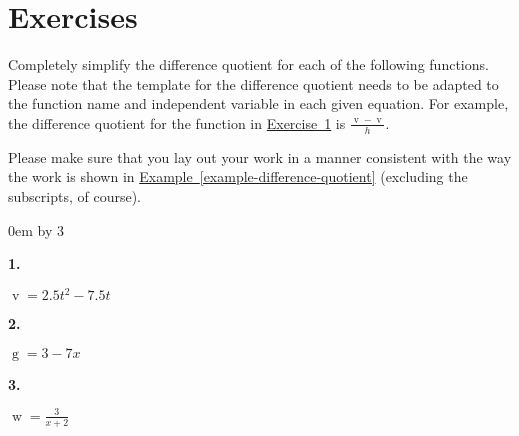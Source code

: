 \documentclass[12pt,]{book}
\theoremstyle{plain}
\theoremstyle{definition}
\numberwithin{equation}{section}
\newenvironment{exercisegroup}%
{\medskip\noindent}%
{\par\bigskip}%
\newlength{\exercisegroupindent}%
\newlength{\exercisegroupitemwidth}%
\newenvironment{exercisegrouplist}%
{\vspace{-\partopsep}%
\begin{adjustwidth}{\exercisegroupindent}{0em}}%
{\end{adjustwidth}%
\vspace{-\partopsep}%
\vspace{\baselineskip}}%
\newenvironment{exercisegroupbyrow}[1]%
{\begin{exercisegrouplist}%
\setlength{\parindent}{0em}%
\setlength{\exercisegroupitemwidth}{\linewidth}%
\addtolength{\exercisegroupitemwidth}{\columnsep}%
\divide\exercisegroupitemwidth by #1%
\addtolength{\exercisegroupitemwidth}{-\columnsep}}%
{\end{exercisegrouplist}}%
\newenvironment{exercisegroupitem}[1]%
{\begin{minipage}[t]{\exercisegroupitemwidth}
\vspace{0pt}%
{\bfseries#1}%
\rule{0pt}{\baselineskip}}{\strut%
\end{minipage}%
\hspace{\columnsep}}%
\providecommand\phantomsection{}
\newcommand{\fe}[2]{\mathop{{#1}{\left(#2\right)}}}
\begin{document}
\section*{Exercises}\label{exercises-3}

\begin{exercisegroup}%
Completely simplify the difference quotient for each of the following functions. Please note that the template for the difference quotient needs to be adapted to the function name and independent variable in each given equation. For example, the difference quotient for the function in \hyperref[exercise-first-difference-quotient]{Exercise~1} is \(\frac{\fe{v}{t+h}-\fe{v}{t}}{h}\).%
\par
Please make sure that you lay out your work in a manner consistent with the way the work is shown in \hyperref[example-difference-quotient]{Example~\ref*{example-difference-quotient}} (excluding the subscripts, of course).%
\par
\begin{exercisegroupbyrow}{3}%
\begin{exercisegroupitem}{1. }\phantomsection\hypertarget{exercise-first-difference-quotient}{\null}
\(\fe{v}{t}=2.5t^2-7.5t\)\end{exercisegroupitem}%
\begin{exercisegroupitem}{2. }\phantomsection\hypertarget{exercise-10}{\null}
\(\fe{g}{x}=3-7x\)\end{exercisegroupitem}%
\begin{exercisegroupitem}{3. }\phantomsection\hypertarget{exercise-11}{\null}
\(\fe{w}{x}=\frac{3}{x+2}\)\end{exercisegroupitem}%
\par%
\end{exercisegroupbyrow}%
\end{exercisegroup}%
\end{document}
